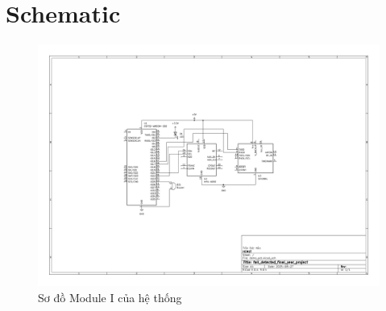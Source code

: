 
\chapter{Schematic}
\label{appendix:schematic}

\begin{figure}[htbp]
    \centering
    \includegraphics[width=\textwidth,keepaspectratio]{figures/module1_schematic.png}
    \caption{Sơ đồ Module I của hệ thống}
    \label{fig:module1_schematic}
\end{figure}
